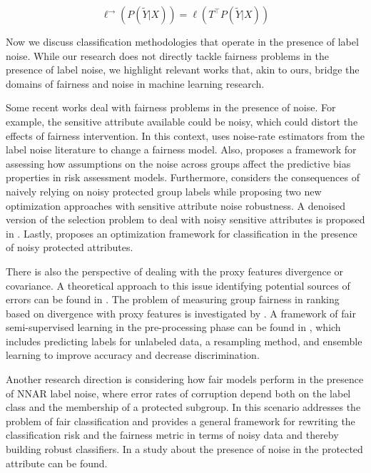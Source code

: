\begin{equation} \label{eq:forward}
    \ell^{\rightarrow}(P(\tilde{Y}|X)) = \ell(T^{\top} P(\tilde{Y}|X))
\end{equation}

Now we discuss classification methodologies that operate in the presence of label noise. While our research does not directly tackle fairness problems in the presence of label noise, we highlight relevant works that, akin to ours, bridge the domains of fairness and noise in machine learning research.

Some recent works deal with fairness problems in the presence of noise. For example, the sensitive attribute available could be noisy, which could distort the effects of fairness intervention. In this context, \cite{Lamy2019} uses noise-rate estimators from the label noise literature to change a fairness model. Also, \cite{Fogliato2020} proposes a framework for assessing how assumptions on the noise across groups affect the predictive bias properties in risk assessment models. Furthermore, \cite{Wang2020} considers the consequences of naively relying on noisy protected group labels while proposing two new optimization approaches with sensitive attribute noise robustness. A denoised version of the selection problem to deal with noisy sensitive attributes is proposed in \cite{Mehrotra2021}. Lastly, \cite{Celis2021} proposes an optimization framework for classification in the presence of noisy protected attributes.

There is also the perspective of dealing with the proxy features divergence or covariance. A theoretical approach to this issue identifying potential sources of errors can be found in \cite{Prost2021}. The problem of measuring group fairness in ranking based on divergence with proxy features is investigated by \cite{Ghazimatin2022}. A framework of fair semi-supervised learning in the pre-processing phase can be found in \cite{Zhang2022}, which includes predicting labels for unlabeled data, a resampling method, and ensemble learning to improve accuracy and decrease discrimination.

Another research direction is considering how fair models perform in the presence of NNAR label noise, where error rates of corruption depend both on the label class and the membership of a protected subgroup. In this scenario \cite{Wang2021} addresses the problem of fair classification and \cite{Wu2022} provides a general framework for rewriting the classification risk and the fairness metric in terms of noisy data and thereby building robust classifiers. In \cite{Ghosh2023} a study about the presence of noise in the protected attribute can be found.

